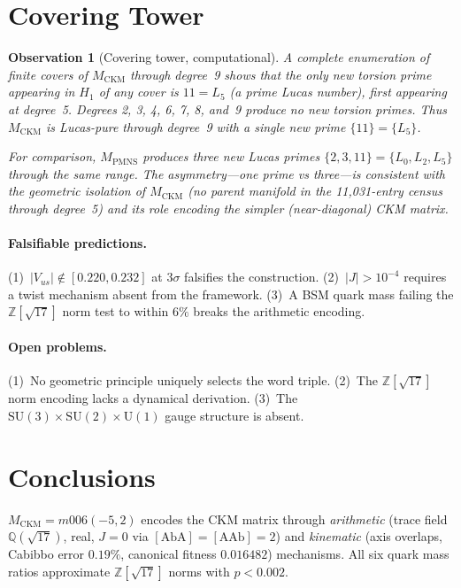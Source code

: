 \documentclass[11pt,a4paper]{article}
\newtheorem{observation}{Observation}
\begin{document}
\section{Covering Tower}
\label{sec:covering}

\begin{observation}[Covering tower, computational]
A complete enumeration of finite covers of $M_{\mathrm{CKM}}$
through degree~9 shows that the only new torsion prime appearing in
$H_1$ of any cover is $11 = L_5$ (a prime Lucas number), first
appearing at degree~5.
Degrees 2, 3, 4, 6, 7, 8, and~9 produce no new torsion primes.
Thus $M_{\mathrm{CKM}}$ is Lucas-pure through degree~9 with a single
new prime $\{11\}=\{L_5\}$.

For comparison, $M_{\mathrm{PMNS}}$ produces three new Lucas primes
$\{2,3,11\}=\{L_0,L_2,L_5\}$ through the same range.
The asymmetry---one prime vs three---is consistent with the geometric
isolation of $M_{\mathrm{CKM}}$ (no parent manifold in the 11,031-entry
census through degree~5) and its role encoding the simpler
(near-diagonal) CKM matrix.
\end{observation}

\paragraph{Falsifiable predictions.}
(1)~$|V_{us}|\notin[0.220,0.232]$ at $3\sigma$ falsifies the construction.
(2)~$|J|>10^{-4}$ requires a twist mechanism absent from the framework.
(3)~A BSM quark mass failing the $\mathbb{Z}[\sqrt{17}]$ norm test
to within $6\%$ breaks the arithmetic encoding.

\paragraph{Open problems.}
(1)~No geometric principle uniquely selects the word triple.
(2)~The $\mathbb{Z}[\sqrt{17}]$ norm encoding lacks a dynamical derivation.
(3)~The $\mathrm{SU}(3)\times\mathrm{SU}(2)\times\mathrm{U}(1)$
gauge structure is absent.

\section{Conclusions}

$M_{\mathrm{CKM}}=m006(-5,2)$ encodes the CKM matrix through
\emph{arithmetic} (trace field $\mathbb{Q}(\sqrt{17})$, real,
$J=0$ via $[\mathrm{AbA}]=[\mathrm{AAb}]=2$) and
\emph{kinematic} (axis overlaps, Cabibbo error $0.19\%$,
canonical fitness $0.016482$) mechanisms.
All six quark mass ratios approximate $\mathbb{Z}[\sqrt{17}]$ norms
with $p<0.002$.
\end{document}
